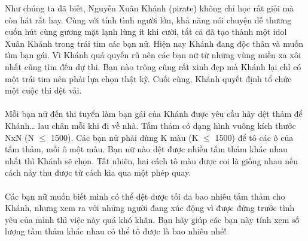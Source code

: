 Như chúng ta đã biết, Nguyễn Xuân Khánh (pirate) không chỉ học rất giỏi mà còn hát rất hay. Cùng với tính tình người lớn, khả năng nói chuyện dễ thương cuốn hút cùng gương mặt lạnh lùng ít khi cười, tất cả đã tạo thành một idol Xuân Khánh trong trái tim các bạn nữ. Hiện nay Khánh đang độc thân và muốn tìm bạn gái. Vì Khánh quá quyến rũ nên các bạn nữ từ những vùng miền xa xôi nhất cũng tìm đến dự thi. Bạn nào trông cũng rất xinh đẹp mà Khánh lại chỉ có một trái tim nên phải lựa chọn thật kỹ. Cuối cùng, Khánh quyết định tổ chức một cuộc thi dệt vải.   
\\
\\   Mỗi bạn nữ đến thi tuyển làm bạn gái của Khánh được yêu cầu hãy dệt thảm để Khánh… lau chân mỗi khi đi về nhà. Tấm thảm có dạng hình vuông kích thước NxN (N $\le$ 1500). Các bạn nữ phải dùng K màu (K $\le$ 1500) để tô các ô của tấm thảm, mỗi ô một màu. Bạn nữ nào dệt được nhiều tấm thảm khác nhau nhất thì Khánh sẽ chọn. Tất nhiên, hai cách tô màu được coi là giống nhau nếu cách này thu được từ cách kia qua một phép quay.   
\\
\\   Các bạn nữ muốn biết mình có thể dệt được tối đa bao nhiêu tấm thảm cho Khánh, nhưng xem ra với những người đang xúc động vì được đứng trước tình yêu của mình thì việc này quá khó khăn. Bạn hãy giúp các bạn này tính xem số lượng tấm thảm khác nhau có thể tô được là bao nhiêu nhé!